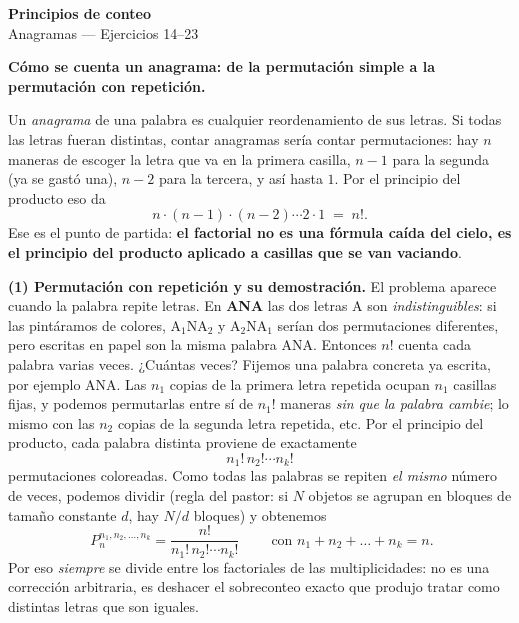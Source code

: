 \documentclass[11pt]{article}
\begin{document}
\begin{center}{\LARGE\bfseries Principios de conteo}\\[2pt]{\large Anagramas --- Ejercicios 14--23}\end{center}

\vspace{4pt}

\begin{teo}
\textbf{Cómo se cuenta un anagrama: de la permutación simple a la permutación con repetición.}

Un \emph{anagrama} de una palabra es cualquier reordenamiento de sus letras. Si todas las letras fueran
distintas, contar anagramas sería contar permutaciones: hay $n$ maneras de escoger la letra que va en la
primera casilla, $n-1$ para la segunda (ya se gastó una), $n-2$ para la tercera, y así hasta $1$. Por el
principio del producto eso da
\[
n\cdot(n-1)\cdot(n-2)\cdots 2\cdot 1 \;=\; n! .
\]
Ese es el punto de partida: \textbf{el factorial no es una fórmula caída del cielo, es el principio del
producto aplicado a casillas que se van vaciando}.

\medskip
\textbf{(1) Permutación con repetición y su demostración.} El problema aparece cuando la palabra repite
letras. En \textbf{ANA} las dos letras A son \emph{indistinguibles}: si las pintáramos de colores,
$\text{A}_1\text{NA}_2$ y $\text{A}_2\text{NA}_1$ serían dos permutaciones diferentes, pero escritas en
papel son la misma palabra ANA. Entonces $n!$ cuenta cada palabra varias veces. ¿Cuántas veces? Fijemos
una palabra concreta ya escrita, por ejemplo ANA. Las $n_1$ copias de la primera letra repetida ocupan
$n_1$ casillas fijas, y podemos permutarlas entre sí de $n_1!$ maneras \emph{sin que la palabra cambie};
lo mismo con las $n_2$ copias de la segunda letra repetida, etc. Por el principio del producto, cada
palabra distinta proviene de exactamente
\[
n_1!\,n_2!\cdots n_k!
\]
permutaciones coloreadas. Como todas las palabras se repiten \emph{el mismo} número de veces, podemos
dividir (regla del pastor: si $N$ objetos se agrupan en bloques de tamaño constante $d$, hay $N/d$
bloques) y obtenemos
\[
\boxed{\;P_n^{n_1,n_2,\dots,n_k}=\frac{n!}{n_1!\,n_2!\cdots n_k!}\;}
\qquad\text{con } n_1+n_2+\dots+n_k=n .
\]
Por eso \emph{siempre} se divide entre los factoriales de las multiplicidades: no es una corrección
arbitraria, es deshacer el sobreconteo exacto que produjo tratar como distintas letras que son iguales.


\end{teo}
\end{document}
